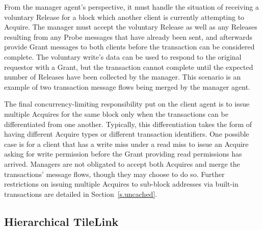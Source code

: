 From the manager agent's perspective, it must handle the situation of receiving a voluntary Release for a block which another client is currently attempting to Acquire.
The manager must accept the voluntary Release as well as any Releases resulting from any Probe messages that have already been sent, and afterwards provide Grant messages to both clients before the transaction can be considered complete.
The voluntary write's data can be used to respond to the original requestor with a Grant, but the transaction cannot complete until the expected number of Releases
have been collected by the manager.
This scenario is an example of two transaction message flows being merged by the manager agent.

The final concurrency-limiting responsibility put on the client agent is to issue multiple Acquires for the same block only when the transactions can be differentiated from one another.
Typically, this differentiation takes the form of having different Acquire types or different transaction identifiers.
One possible case is for a client that has a write miss under a read miss to issue an Acquire asking for write permission before the Grant providing read permissions has arrived.
Managers are not obligated to accept both Acquires and merge the transactions' message flows, though they may choose to do so.
Further restrictions on issuing multiple Acquires to sub-block addresses via built-in transactions are detailed in Section~\ref{s.uncached}.


\subsection{Hierarchical TileLink}
\label{s.tlhier}

